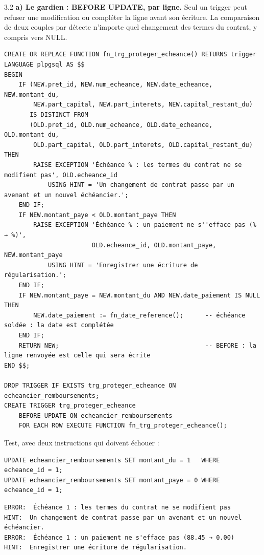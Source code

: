 \begin{correction}{3.2}
\textbf{a) Le gardien : BEFORE UPDATE, par ligne.} Seul un trigger  peut refuser une
modification ou compléter la ligne avant son écriture. La comparaison de deux couples par
 détecte n'importe quel changement des termes du contrat, y compris vers NULL.

\begin{lstlisting}[style=long]
CREATE OR REPLACE FUNCTION fn_trg_proteger_echeance() RETURNS trigger
LANGUAGE plpgsql AS $$
BEGIN
    IF (NEW.pret_id, NEW.num_echeance, NEW.date_echeance, NEW.montant_du,
        NEW.part_capital, NEW.part_interets, NEW.capital_restant_du)
       IS DISTINCT FROM
       (OLD.pret_id, OLD.num_echeance, OLD.date_echeance, OLD.montant_du,
        OLD.part_capital, OLD.part_interets, OLD.capital_restant_du) THEN
        RAISE EXCEPTION 'Échéance % : les termes du contrat ne se modifient pas', OLD.echeance_id
            USING HINT = 'Un changement de contrat passe par un avenant et un nouvel échéancier.';
    END IF;
    IF NEW.montant_paye < OLD.montant_paye THEN
        RAISE EXCEPTION 'Échéance % : un paiement ne s''efface pas (% → %)',
                        OLD.echeance_id, OLD.montant_paye, NEW.montant_paye
            USING HINT = 'Enregistrer une écriture de régularisation.';
    END IF;
    IF NEW.montant_paye = NEW.montant_du AND NEW.date_paiement IS NULL THEN
        NEW.date_paiement := fn_date_reference();      -- échéance soldée : la date est complétée
    END IF;
    RETURN NEW;                                        -- BEFORE : la ligne renvoyée est celle qui sera écrite
END $$;

DROP TRIGGER IF EXISTS trg_proteger_echeance ON echeancier_remboursements;
CREATE TRIGGER trg_proteger_echeance
    BEFORE UPDATE ON echeancier_remboursements
    FOR EACH ROW EXECUTE FUNCTION fn_trg_proteger_echeance();
\end{lstlisting}

Test, avec deux instructions qui doivent échouer :
\begin{lstlisting}[style=sql]
UPDATE echeancier_remboursements SET montant_du = 1   WHERE echeance_id = 1;
UPDATE echeancier_remboursements SET montant_paye = 0 WHERE echeance_id = 1;
\end{lstlisting}
\begin{lstlisting}[style=sortie]
ERROR:  Échéance 1 : les termes du contrat ne se modifient pas
HINT:  Un changement de contrat passe par un avenant et un nouvel échéancier.
ERROR:  Échéance 1 : un paiement ne s'efface pas (88.45 → 0.00)
HINT:  Enregistrer une écriture de régularisation.
\end{lstlisting}


\end{correction}

